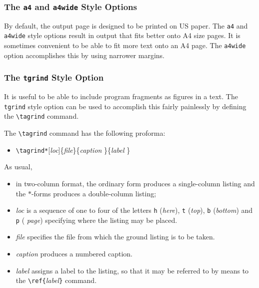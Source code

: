 \subsubsection{The {\tt a4} and {\tt a4wide} Style Options}

By default, the output page is designed to be printed on US paper.
The {\tt a4} and {\tt a4wide} style options result in output
that fits better onto A4 size pages.
It is sometimes convenient to be able to fit more text onto an A4 page.
The {\tt a4wide} option accomplishes this by using narrower margins.

\subsubsection{The {\tt tgrind} Style Option}{\label{tagrind}}

It is useful to be able to include program fragments as figures in a
text.  The {\tt tgrind} style option can be used to accomplish this
fairly painlessly by defining the \verb|\tagrind| command. 

The \verb|\tagrind| command has the following proforma:
\begin{itemize} \tt
\item[]
\verb|\tagrind*|[{\it loc\/}]\{{\it file\/}\}\{{\it caption \/}\}\{{\it label \/}\}
\end{itemize}

As usual,
\begin{itemize}
\item in two-column format, the ordinary form produces a
single-column listing and the $\ast$-forms produces a double-column listing;

\item {\it loc\/}
is a sequence of one to four of the letters \verb|h| ({\it here\/}),
\verb|t| ({\it top\/}), \verb|b| ({\it bottom\/}) and \verb|p| ({\it
page\/}) specifying where the listing may be placed. 

\item {\it file} specifies the file from which the ground listing
is to be taken.

\item {\it caption} produces a numbered caption.

\item {\it label} assigns a label to the listing, so that it may be
referred to by means to the \verb|\ref{|{\it label\/}\verb|}| command.

\end{itemize}

